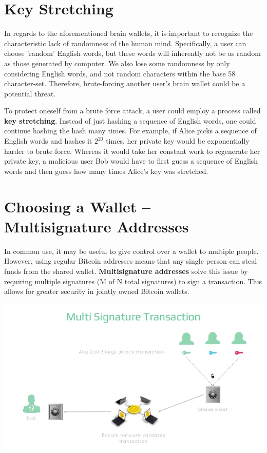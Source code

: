 \documentclass[11pt]{article}
\begin{document}
    \section*{Key Stretching}
    
    In regards to the aforementioned brain wallets, it is important to recognize the characteristic lack of randomness of the human mind. Specifically, a user can choose 'random' English words, but these words will inherently not be as random as those generated by computer. We also lose some randomness by only considering English words, and not random characters within the base 58 character-set. Therefore, brute-forcing another user's brain wallet could be a potential threat.
    
    To protect oneself from a brute force attack, a user could employ a process called \textbf{key stretching}. Instead of just hashing a sequence of English words, one could continue hashing the hash many times. For example, if Alice picks a sequence of English words and hashes it $2^{20}$ times, her private key would be exponentially harder to brute force. Whereas it would take her constant work to regenerate her private key, a malicious user Bob would have to first guess a sequence of English words and then guess how many times Alice's key was stretched. 
    
    \section*{Choosing a Wallet -- Multisignature Addresses}
    
    In common use, it may be useful to give control over a wallet to multiple people. However, using regular Bitcoin addresses means that any single person can steal funds from the shared wallet. \textbf{Multisignature addresses} solve this issue by requiring multiple signatures (M of N total signatures) to sign a transaction. This allows for greater security in jointly owned Bitcoin wallets. 
    
   \includegraphics[scale=0.6]{multisig}
\end{document}
